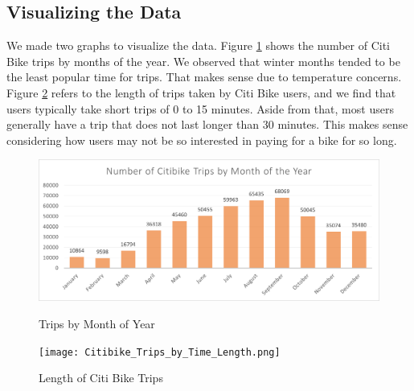 \documentclass{article}
\begin{document}
\subsection{Visualizing the Data}
We made two graphs to visualize the data. Figure \ref{fig:trip_month} shows the number of Citi Bike trips by months of the year. We observed that winter months tended to be the least popular time for trips. That makes sense due to temperature concerns. Figure \ref{fig:trip_time} refers to the length of trips taken by Citi Bike users, and we find that users typically take short trips of 0 to 15 minutes. Aside from that, most users generally have a trip that does not last longer than 30 minutes. This makes sense considering how users may not be so interested in paying for a bike for so long.
\begin{figure}[h!]
    \centering
    \caption{Trips by Month of Year}
    \includegraphics[scale = 0.8]{Citibike Trips by Month.png}    
    \label{fig:trip_month}
\end{figure}

\begin{figure}[h!]
    \centering
    \caption{Length of Citi Bike Trips}
    \texttt{[image: Citibike\_Trips\_by\_Time\_Length.png]}
    \label{fig:trip_time}
\end{figure}

\newpage
\end{document}
